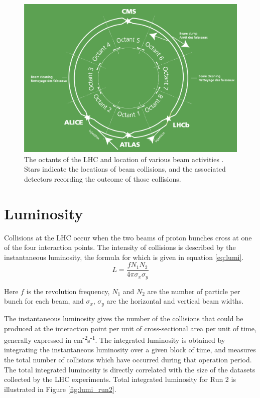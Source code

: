 \begin{figure}
        \centering
	\includegraphics[width=.7\textwidth]{figures/ch3/lhc_octants.png}
	\caption{The octants of the LHC and location of various beam activities \cite{lhc_faq}. Stars indicate the locations of beam collisions, and the associated detectors recording the outcome of those collisions.}
	\label{fig:lhc_octants}
\end{figure} 
 
 \section{Luminosity}
 
Collisions at the LHC occur when the two beams of proton bunches cross at one of the four interaction points. The intensity of collisions is described by the instantaneous luminosity, the formula for which is given in equation \ref{eq:lumi}.  
 \begin{equation}
	L = \frac{f N_1 N_2}{4 \pi \sigma_x \sigma_y}
	\label{eq:lumi}
\end{equation}

Here $f$ is the revolution frequency, $N_1$ and $N_2$ are the number of particle per bunch for each beam, and $\sigma_x$, $\sigma_y$ are the horizontal and vertical beam widths. \par

The instantaneous luminosity gives the number of the collisions that could be produced at the interaction point per unit of cross-sectional area per unit of time, generally expressed in cm\textsuperscript{-2}s\textsuperscript{-1}. The integrated luminosity is obtained by integrating the instantaneous luminosity over a given block of time, and measures the total number of collisions which have occurred during that operation period. The total integrated luminosity is directly correlated with the size of the datasets collected by the LHC experiments. Total integrated luminosity for Run 2 is illustrated in Figure \ref{fig:lumi_run2}. \par 

